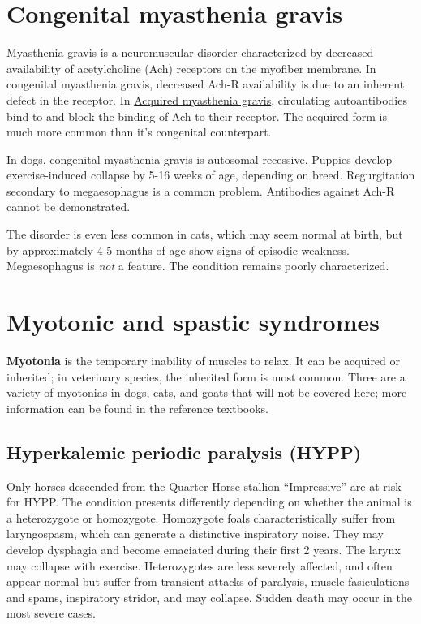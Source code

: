 \documentclass[openany]{book}
\begin{document}
\hypertarget{congenital-myasthenia-gravis}{\section{Congenital
myasthenia gravis}\label{congenital-myasthenia-gravis}}

Myasthenia gravis is a neuromuscular disorder characterized by decreased
availability of acetylcholine (Ach) receptors on the myofiber membrane.
In congenital myasthenia gravis, decreased Ach-R availability is due to
an inherent defect in the receptor. In
\protect\hyperlink{acquired-myasthenia-gravis}{Acquired myasthenia
gravis}, circulating autoantibodies bind to and block the binding of Ach
to their receptor. The acquired form is much more common than it's
congenital counterpart.

In dogs, congenital myasthenia gravis is autosomal recessive. Puppies
develop exercise-induced collapse by 5-16 weeks of age, depending on
breed. Regurgitation secondary to megaesophagus is a common problem.
Antibodies against Ach-R cannot be demonstrated.

The disorder is even less common in cats, which may seem normal at
birth, but by approximately 4-5 months of age show signs of episodic
weakness. Megaesophagus is \emph{not} a feature. The condition remains
poorly characterized.

\section{Myotonic and spastic
syndromes}\label{myotonic-and-spastic-syndromes}

\textbf{Myotonia} is the temporary inability of muscles to relax. It can
be acquired or inherited; in veterinary species, the inherited form is
most common. Three are a variety of myotonias in dogs, cats, and goats
that will not be covered here; more information can be found in the
reference textbooks.

\hypertarget{hyperkalemic-periodic-paralysis-hypp}{\subsection{Hyperkalemic
periodic paralysis (HYPP)}\label{hyperkalemic-periodic-paralysis-hypp}}

Only horses descended from the Quarter Horse stallion ``Impressive'' are
at risk for HYPP. The condition presents differently depending on
whether the animal is a heterozygote or homozygote. Homozygote foals
characteristically suffer from laryngospasm, which can generate a
distinctive inspiratory noise. They may develop dysphagia and become
emaciated during their first 2 years. The larynx may collapse with
exercise. Heterozygotes are less severely affected, and often appear
normal but suffer from transient attacks of paralysis, muscle
fasiculations and spams, inspiratory stridor, and may collapse. Sudden
death may occur in the most severe cases.
\end{document}
